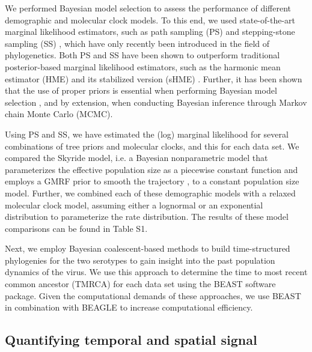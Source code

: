 \documentclass[10pt]{article}
\begin{document}
We performed Bayesian model selection to assess the performance of different demographic and molecular clock models.
To this end, we used state-of-the-art marginal likelihood estimators, such as path sampling (PS) \cite{LartillotPhilippe} and stepping-stone sampling (SS) \cite{Xie}, which have only recently been introduced in the field of phylogenetics.
Both PS and SS have been shown to outperform traditional posterior-based marginal likelihood estimators, such as the harmonic mean estimator (HME) and its stabilized version (sHME) \cite{LartillotPhilippe,Xie,Baele2012,Baele2013a,Baele2013b}.
Further, it has been shown that the use of proper priors is essential when performing Bayesian model selection \cite{Baele2013a}, and by extension, when conducting Bayesian inference through Markov chain Monte Carlo (MCMC).
                                                                       

Using PS and SS, we have estimated the (log) marginal likelihood for several combinations of tree priors and molecular clocks, and this for each data set.
We compared the Skyride model, i.e. a Bayesian nonparametric model that parameterizes the effective population size as a piecewise constant function and employs a GMRF prior to smooth the trajectory \cite{skygrid}, to a constant population size model.
Further, we combined each of these demographic models with a relaxed molecular clock model, assuming either a lognormal or an exponential distribution to parameterize the rate distribution.
The results of these model comparisons can be found in Table S1.

Next, we employ Bayesian coalescent-based methods to build time-structured phylogenies for the two serotypes to gain insight into the past population dynamics of the virus.
We use this approach to determine the time to most recent common ancestor (TMRCA) for each data set using the BEAST \cite{BEAST} software package.
 Given the computational demands of these approaches, we use BEAST \cite{BEAST} in combination with BEAGLE \cite{BEAGLE} to increase computational efficiency.


\subsection*{Quantifying temporal and spatial signal} 
\end{document}
